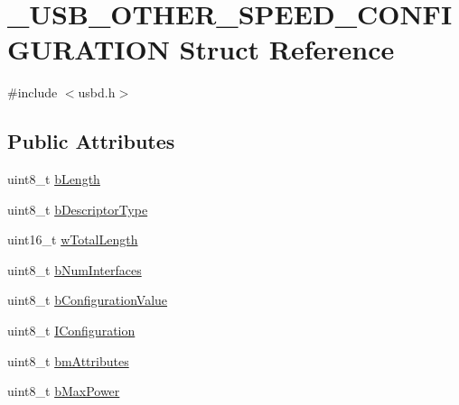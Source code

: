 \hypertarget{struct___u_s_b___o_t_h_e_r___s_p_e_e_d___c_o_n_f_i_g_u_r_a_t_i_o_n}{}\section{\+\_\+\+U\+S\+B\+\_\+\+O\+T\+H\+E\+R\+\_\+\+S\+P\+E\+E\+D\+\_\+\+C\+O\+N\+F\+I\+G\+U\+R\+A\+T\+I\+ON Struct Reference}
\label{struct___u_s_b___o_t_h_e_r___s_p_e_e_d___c_o_n_f_i_g_u_r_a_t_i_o_n}


{\ttfamily \#include $<$usbd.\+h$>$}

\subsection*{Public Attributes}
\begin{DoxyCompactItemize}
\item 
uint8\+\_\+t \hyperlink{struct___u_s_b___o_t_h_e_r___s_p_e_e_d___c_o_n_f_i_g_u_r_a_t_i_o_n_a8c70170e1f5bfcc1d77a8357a254050c}{b\+Length}
\item 
uint8\+\_\+t \hyperlink{struct___u_s_b___o_t_h_e_r___s_p_e_e_d___c_o_n_f_i_g_u_r_a_t_i_o_n_ab8d0e53addf9904fbcad68ae45399805}{b\+Descriptor\+Type}
\item 
uint16\+\_\+t \hyperlink{struct___u_s_b___o_t_h_e_r___s_p_e_e_d___c_o_n_f_i_g_u_r_a_t_i_o_n_af624dbc10570cb8fbca7323c6bffcb70}{w\+Total\+Length}
\item 
uint8\+\_\+t \hyperlink{struct___u_s_b___o_t_h_e_r___s_p_e_e_d___c_o_n_f_i_g_u_r_a_t_i_o_n_a7ebb3afc825c1940c5ff1c5b2907ac38}{b\+Num\+Interfaces}
\item 
uint8\+\_\+t \hyperlink{struct___u_s_b___o_t_h_e_r___s_p_e_e_d___c_o_n_f_i_g_u_r_a_t_i_o_n_a7e753546b3365270dd7904762c1cd104}{b\+Configuration\+Value}
\item 
uint8\+\_\+t \hyperlink{struct___u_s_b___o_t_h_e_r___s_p_e_e_d___c_o_n_f_i_g_u_r_a_t_i_o_n_a69e71d4b33b56469a4388c07e811e390}{I\+Configuration}
\item 
uint8\+\_\+t \hyperlink{struct___u_s_b___o_t_h_e_r___s_p_e_e_d___c_o_n_f_i_g_u_r_a_t_i_o_n_a5891367fc0fe6631ae99f1751651f81b}{bm\+Attributes}
\item 
uint8\+\_\+t \hyperlink{struct___u_s_b___o_t_h_e_r___s_p_e_e_d___c_o_n_f_i_g_u_r_a_t_i_o_n_a3764f1ba43fd9b053b8e4675e306ff5b}{b\+Max\+Power}
\end{DoxyCompactItemize}


